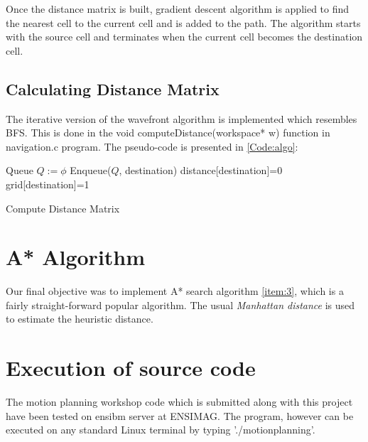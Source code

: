 \documentclass[12pt]{article}
\begin{document}
Once the distance matrix is built, gradient descent
  algorithm is applied to find the nearest cell to the current cell
  and is added to the path. The algorithm starts with the source cell and terminates when the current cell becomes the destination cell. 

\subsection{Calculating Distance Matrix}

 The iterative version of the wavefront algorithm is implemented
 which resembles BFS. This is done in the \textsf{void
   computeDistance(workspace* w)} function in \textsf{navigation.c}
 program. The pseudo-code is presented in \autoref{Code:algo}: \\


\linesnumbered
\begin{algorithm}[H]
 \SetVline
 Queue $Q:=\phi$\;
 Enqueue($Q$, destination)\;
 distance[destination]=$0$\;
 grid[destination]=1\;
 \caption{Compute Distance Matrix \label{Code:algo}}
\end{algorithm}



\section{A* Algorithm}
	Our final objective was to implement A* search algorithm
  \ref{item:3}, which is a fairly straight-forward popular
  algorithm. The usual \textit{Manhattan distance} is used to estimate
  the heuristic distance.
	
\section{Execution of source code}

	The motion planning workshop code which is submitted along with this
  project have been tested on \textsf{ensibm} server at ENSIMAG. The
  program, however can be executed on any standard Linux terminal by
  typing \textsf{'./motionplanning'}. 
\end{document}
